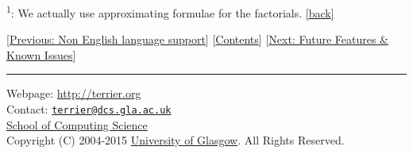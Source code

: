 \href{}{}\textsuperscript{1}: We actually use approximating formulae for
the factorials. \protect\hyperlink{back1}{{[}back{]}}

{[}\href{languages.html}{Previous: Non English language support}{]}
{[}\href{index.html}{Contents}{]} {[}\href{todo.html}{Next: Future
Features \& Known Issues}{]}

\begin{center}\rule{0.5\linewidth}{\linethickness}\end{center}

Webpage: \url{http://terrier.org}\\
Contact:
\href{mailto:terrier@dcs.gla.ac.uk}{\nolinkurl{terrier@dcs.gla.ac.uk}}\\
\href{http://www.dcs.gla.ac.uk/}{School of Computing Science}\\
Copyright (C) 2004-2015 \href{http://www.gla.ac.uk/}{University of
Glasgow}. All Rights Reserved.\\
